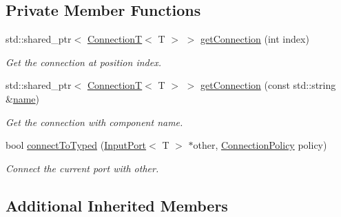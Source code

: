 \subsection*{Private Member Functions}
\begin{DoxyCompactItemize}
\item 
\hypertarget{classcoco_1_1_output_port_a3cfb5103a317583146b7d3697ae78230}{}std\+::shared\+\_\+ptr$<$ \hyperlink{classcoco_1_1_connection_t}{Connection\+T}$<$ T $>$ $>$ \hyperlink{classcoco_1_1_output_port_a3cfb5103a317583146b7d3697ae78230}{get\+Connection} (int index)\label{classcoco_1_1_output_port_a3cfb5103a317583146b7d3697ae78230}

\begin{DoxyCompactList}\small\item\em Get the connection at position {\ttfamily index}. \end{DoxyCompactList}\item 
\hypertarget{classcoco_1_1_output_port_acc332d8226110146626fcbdf78d36713}{}std\+::shared\+\_\+ptr$<$ \hyperlink{classcoco_1_1_connection_t}{Connection\+T}$<$ T $>$ $>$ \hyperlink{classcoco_1_1_output_port_acc332d8226110146626fcbdf78d36713}{get\+Connection} (const std\+::string \&\hyperlink{classcoco_1_1_port_base_abf4eb7fcc3ec9973ee73dd140e7646db}{name})\label{classcoco_1_1_output_port_acc332d8226110146626fcbdf78d36713}

\begin{DoxyCompactList}\small\item\em Get the connection with component {\ttfamily name}. \end{DoxyCompactList}\item 
\hypertarget{classcoco_1_1_output_port_aee7aa5a4c469f686d560fd9b3ddb78e1}{}bool \hyperlink{classcoco_1_1_output_port_aee7aa5a4c469f686d560fd9b3ddb78e1}{connect\+To\+Typed} (\hyperlink{classcoco_1_1_input_port}{Input\+Port}$<$ T $>$ $\ast$other, \hyperlink{structcoco_1_1_connection_policy}{Connection\+Policy} policy)\label{classcoco_1_1_output_port_aee7aa5a4c469f686d560fd9b3ddb78e1}

\begin{DoxyCompactList}\small\item\em Connect the current port with {\ttfamily other}. \end{DoxyCompactList}\end{DoxyCompactItemize}
\subsection*{Additional Inherited Members}


